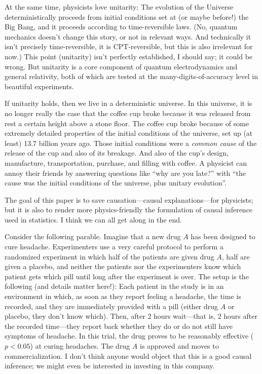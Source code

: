 \documentclass[12pt]{article}
\begin{document}
At the same time, physicists love unitarity:
The evolution of the Universe deterministically proceeds from initial conditions set at (or maybe before!) the Big Bang, and it proceeds according to time-reversible laws.
(No, quantum mechanics doesn't change this story, or not in relevant ways. And technically it isn't precisely time-reversible, it is CPT-reversible, but this is also irrelevant for now.)
This point (unitarity) isn't perfectly established, I should say; it could be wrong.
But unitarity is a core component of quantum electrodynamics and general relativity, both of which are tested at the many-digits-of-accuracy level in beautiful experiments.

If unitarity holds, then we live in a deterministic universe.
In this universe, it is no longer really the case that the coffee cup broke because it was released from rest a certain height above a stone floor.
The coffee cup broke because of some extremely detailed properties of the initial conditions of the universe, set up (at least) 13.7 billion years ago.
Those initial conditions were a \emph{common cause} of the release of the cup and also of its breakage.
And also of the cup's design, manufacture, transportation, purchase, and filling with coffee.
A physicist can annoy their friends by answering questions like ``why are you late?'' with ``the cause was the initial conditions of the universe, plus unitary evolution''.

The goal of this paper is to save causation---causal explanations---for physicists; but it is also to render more physics-friendly the formulation of causal inference used in statistics.
I think we can all get along in the end.

Consider the following parable.
Imagine that a new drug $A$ has been designed to cure headache.
Experimenters use a very careful protocol to perform a randomized experiment in which half of the patients are given drug $A$, half are given a placebo, and neither the patients nor the experimenters know which patient gets which pill until long after the experiment is over.
The setup is the following (and details matter here!):
Each patient in the study is in an environment in which, as soon as they report feeling a headache, the time is recorded, and they are immediately provided with a pill (either drug $A$ or placebo, they don't know which).
Then, after 2 hours wait---that is, 2 hours after the recorded time---they report back whether they do or do not still have symptoms of headache.
In this trial, the drug proves to be reasonably effective ($p<0.05$) at curing headaches.
The drug $A$ is approved and moves to commercialization.
I don't think anyone would object that this is a good causal inference; we might even be interested in investing in this company.
\end{document}
